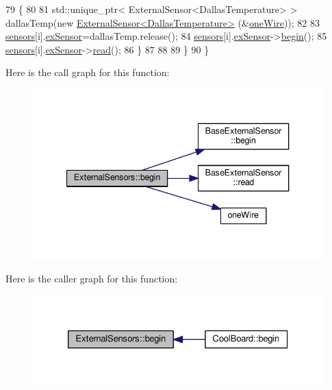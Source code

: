 \begin{DoxyCode}
79         \{
80 
81             std::unique\_ptr< ExternalSensor<DallasTemperature> > dallasTemp(\textcolor{keyword}{new} 
      \hyperlink{class_external_sensor_3_01_dallas_temperature_01_4}{ExternalSensor<DallasTemperature>} (&\hyperlink{_external_sensors_8cpp_af39fa3dad1ba161b384c0b26b8145e65}{oneWire}));
82              
83             \hyperlink{class_external_sensors_a284233f884fcf00154a44740cf1d9e1e}{sensors}[i].\hyperlink{struct_external_sensors_1_1sensor_a9bca150fd468b8d0e090e6d72c5c2b48}{exSensor}=dallasTemp.release();
84             \hyperlink{class_external_sensors_a284233f884fcf00154a44740cf1d9e1e}{sensors}[i].\hyperlink{struct_external_sensors_1_1sensor_a9bca150fd468b8d0e090e6d72c5c2b48}{exSensor}->\hyperlink{class_base_external_sensor_a87d132803d4f4fdd4e66332809f0c9a0}{begin}();
85             \hyperlink{class_external_sensors_a284233f884fcf00154a44740cf1d9e1e}{sensors}[i].\hyperlink{struct_external_sensors_1_1sensor_a9bca150fd468b8d0e090e6d72c5c2b48}{exSensor}->\hyperlink{class_base_external_sensor_a1564f16deacf57b51b9948ac29db4291}{read}();
86         \}
87         
88         
89     \}
90 \}
\end{DoxyCode}
Here is the call graph for this function\+:\nopagebreak
\begin{figure}[H]
\begin{center}
\leavevmode
\includegraphics[width=340pt]{d1/d2f/class_external_sensors_a58ede0d786a86417254708870f04a21e_cgraph}
\end{center}
\end{figure}
Here is the caller graph for this function\+:\nopagebreak
\begin{figure}[H]
\begin{center}
\leavevmode
\includegraphics[width=326pt]{d1/d2f/class_external_sensors_a58ede0d786a86417254708870f04a21e_icgraph}
\end{center}
\end{figure}
\mbox{\label{class_external_sensors_a862a4bd11346b37270d0244c2adabe5a}} 
